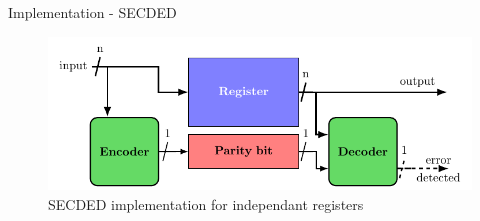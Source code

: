 \begin{frame}{Implementation - SECDED}
    \begin{figure}
        \centering
        \includegraphics[width=.8\textwidth, page=4]{src/3_strategies/img/archi_contremesures.pdf}
        \caption{SECDED implementation for independant registers}
        \label{fig:secded_implem_independant_register}
    \end{figure}
\end{frame}

